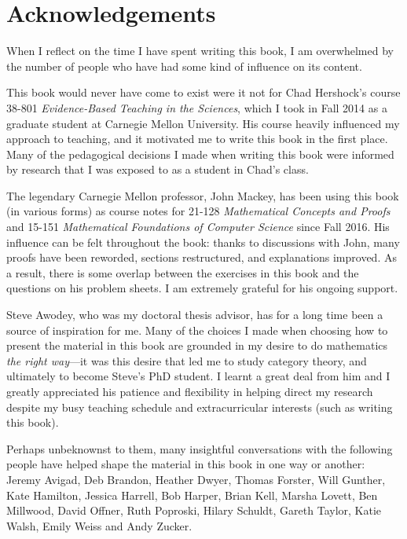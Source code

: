 \chapter*{Acknowledgements}

When I reflect on the time I have spent writing this book, I am overwhelmed by the number of people who have had some kind of influence on its content.

This book would never have come to exist were it not for Chad Hershock's course 38-801 \textit{Evidence-Based Teaching in the Sciences}, which I took in Fall 2014 as a graduate student at Carnegie Mellon University. His course heavily influenced my approach to teaching, and it motivated me to write this book in the first place. Many of the pedagogical decisions I made when writing this book were informed by research that I was exposed to as a student in Chad's class.

The legendary Carnegie Mellon professor, John Mackey, has been using this book (in various forms) as course notes for 21-128 \textit{Mathematical Concepts and Proofs} and 15-151 \textit{Mathematical Foundations of Computer Science} since Fall 2016. His influence can be felt throughout the book: thanks to discussions with John, many proofs have been reworded, sections restructured, and explanations improved. As a result, there is some overlap between the exercises in this book and the questions on his problem sheets. I am extremely grateful for his ongoing support.

Steve Awodey, who was my doctoral thesis advisor, has for a long time been a source of inspiration for me. Many of the choices I made when choosing how to present the material in this book are grounded in my desire to do mathematics \textit{the right way}---it was this desire that led me to study category theory, and ultimately to become Steve's PhD student. I learnt a great deal from him and I greatly appreciated his patience and flexibility in helping direct my research despite my busy teaching schedule and extracurricular interests (such as writing this book).

Perhaps unbeknownst to them, many insightful conversations with the following people have helped shape the material in this book in one way or another: Jeremy Avigad, Deb Brandon, Heather Dwyer, Thomas Forster, Will Gunther, Kate Hamilton, Jessica Harrell, Bob Harper, Brian Kell, Marsha Lovett, Ben Millwood, David Offner, Ruth Poproski, Hilary Schuldt, Gareth Taylor, Katie Walsh, Emily Weiss and Andy Zucker.

